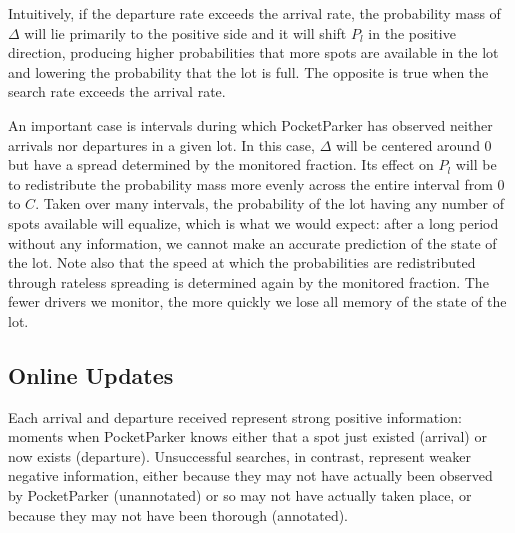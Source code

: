 Intuitively, if the departure rate exceeds the arrival rate, the probability
mass of $\Delta$ will lie primarily to the positive side and it will shift
$P_l$ in the positive direction, producing higher probabilities that more
spots are available in the lot and lowering the probability that the lot is
full. The opposite is true when the search rate exceeds the arrival rate.

An important case is intervals during which PocketParker has observed neither
arrivals nor departures in a given lot. In this case, $\Delta$ will be
centered around $0$ but have a spread determined by the monitored fraction.
Its effect on $P_l$ will be to redistribute the probability mass more evenly
across the entire interval from $0$ to $C$. Taken over many intervals, the
probability of the lot having any number of spots available will equalize,
which is what we would expect: after a long period without any information,
we cannot make an accurate prediction of the state of the lot. Note also that
the speed at which the probabilities are redistributed through rateless
spreading is determined again by the monitored fraction. The fewer drivers we
monitor, the more quickly we lose all memory of the state of the lot.

\subsection{Online Updates}
\label{subsec-online}

Each arrival and departure received represent strong positive information:
moments when PocketParker knows either that a spot just existed (arrival) or
now exists (departure). Unsuccessful searches, in contrast, represent weaker
negative information, either because they may not have actually been observed
by PocketParker (unannotated) or so may not have actually taken place, or
because they may not have been thorough (annotated).
